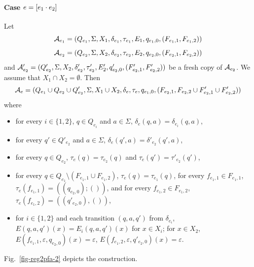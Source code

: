 \paragraph{Case $e = [e_1 \cdot e_2]$} 
Let 
\[\mathcal{A}_{e_1} = (Q_{e_1}, \Sigma, X_1, \delta_{e_1}, \tau_{e_1}, E_1, q_{e_1,0}, (F_{e_1,1}, F_{e_1,2}))\]
%
\[\mathcal{A}_{e_2} = (Q_{e_2}, \Sigma, X_2, \delta_{e_2}, \tau_{e_2}, E_2, q_{e_2,0}, (F_{e_2, 1}, F_{e_2,2}))\] and
%
$\mathcal{A}'_{e_2} = (Q'_{e_2}, \Sigma, X_2, \delta'_{e_2}, \tau'_{e_2}, E_2', q'_{e_2,0}, (F'_{e_2, 1}, F'_{e_2,2}))$ be a fresh copy of $\mathcal{A}_{e_2}$. We assume that $X_1\cap X_2=\emptyset$. Then 
%
\[\mathcal{A}_e = ( Q_{e_1} \cup Q_{e_2} \cup Q'_{e_2}, \Sigma, X_1\cup X_2, \delta_e, \tau_e, q_{e_1,0}, (F_{e_2,1}, F_{e_2,2} \cup F'_{e_2,1} \cup F'_{e_2,2}))\] where 
	\begin{itemize}
	 \item for every $i \in \{1,2\}$, $q \in Q_{e_i}$ and $a \in \Sigma$, $\delta_e(q, a) = \delta_{e_i}(q, a)$,
	\item for every $q' \in Q'_{e_2}$ and $a \in \Sigma$, $\delta_e(q', a) = \delta'_{e_2}(q',a)$, 
	\item for every $q \in Q_{e_2}$, $\tau_e(q) = \tau_{e_2}(q)$ and $\tau_e(q') = \tau'_{e_2}(q')$, 
	\item for every $q \in Q_{e_1} \setminus (F_{e_1,1} \cup F_{e_1,2})$, $\tau_e(q) = \tau_{e_1}(q)$, for every $f_{e_1,1} \in F_{e_1,1}$, $\tau_e(f_{e_1,1}) = ((q_{e_2,0}); ())$, and for every $f_{e_1,2} \in F_{e_1,2}$, $\tau_e(f_{e_1,2}) = ((q'_{e_2,0}), ())$,
	\item for $i\in \{1,2\}$ and each transition $(q, a, q')$ from $\delta_{e_i}$, $E(q,a,q')(x) = E_i(q,a,q')(x)$ for $x\in X_i$; for $x\in X_2$, $E(f_{e_1,1},\varepsilon,q_{e_2,0})(x) =\varepsilon$, $E(f_{e_1,2},\varepsilon,q'_{e_2,0})(x) =\varepsilon$.
  \end{itemize}
 Fig.~\ref{fig-reg2pfa-2} depicts the construction. 
